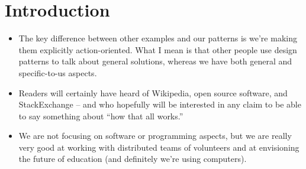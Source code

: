 \section{Introduction}

\begin{itemize}
\item The key difference between other examples and our
patterns is we're making them explicitly action-oriented.  What I mean
is that other people use design patterns to talk about general
solutions, whereas we have both general and specific-to-us aspects.
\item Readers will certainly have heard of Wikipedia, open source
software, and StackExchange -- and who hopefully will be interested in
any claim to be able to say something about ``how that all works.''
\item We are not focusing on software or programming aspects, but we
are really very good at working with distributed teams of volunteers and
at envisioning the future of education (and definitely we're using
computers).
\end{itemize}